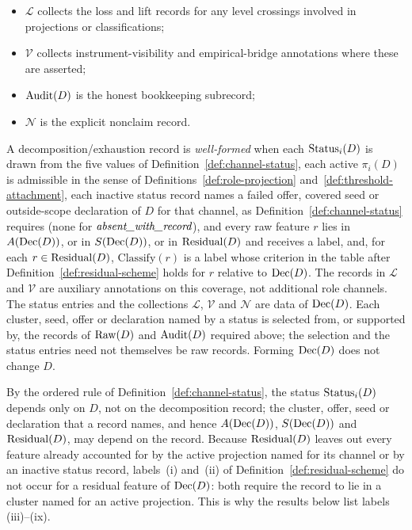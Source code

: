 \begin{definition}
\begin{itemize}[topsep=2pt,itemsep=1pt]
    relative to the chosen record, and \(\mathrm{Classify}\) assigns to each
    \(r \in \Residual{D}\), including any bookkeeping annotation not assigned
    to a channel, a label in the scheme of
    Definition~\ref{def:residual-scheme}; already covered bookkeeping may
    receive (ix);
  \item \(\mathcal{L}\) collects the loss and lift records for any level
    crossings involved in projections or classifications;
  \item \(\mathcal{V}\) collects instrument-visibility and
    empirical-bridge annotations where these are asserted;
  \item \(\operatorname{Audit}\!\left(D\right)\) is the honest bookkeeping subrecord;
  \item \(\mathcal{N}\) is the explicit nonclaim record.
\end{itemize}
A decomposition/exhaustion record is \emph{well-formed} when each
\(\operatorname{Status}_{i}\!\left(D\right)\) is drawn from the five values of
Definition~\ref{def:channel-status}, each active
\(\pi_i(D)\) is admissible in the sense of
Definitions~\ref{def:role-projection} and~\ref{def:threshold-attachment},
each inactive status record names a failed offer, covered seed or
outside-scope declaration of \(D\) for that channel, as
Definition~\ref{def:channel-status} requires (none for \(\textit{absent\_\allowbreak with\_\allowbreak record}\)), and every raw feature \(r\) lies in \(A(\operatorname{Dec}\!\left(D\right))\), or in \(S(\operatorname{Dec}\!\left(D\right))\), or in
\(\operatorname{Residual}\!\left(D\right)\) and receives a label, and, for each
\(r\in\Residual{D}\), \(\mathrm{Classify}(r)\) is a label whose criterion in the
table after Definition~\ref{def:residual-scheme} holds for \(r\) relative to
\(\operatorname{Dec}\!\left(D\right)\). The records in
\(\mathcal{L}\) and \(\mathcal{V}\) are auxiliary annotations on this
coverage, not additional role channels. The status entries and the
collections \(\mathcal{L}\), \(\mathcal{V}\) and \(\mathcal{N}\) are data
of \(\operatorname{Dec}\!\left(D\right)\). Each cluster, seed, offer or declaration named by a status is
selected from, or supported by, the records of \(\operatorname{Raw}\!\left(D\right)\) and \(\operatorname{Audit}\!\left(D\right)\)
required above; the selection and the status entries need not themselves be
raw records. Forming \(\operatorname{Dec}\!\left(D\right)\) does not change \(D\).
\end{definition}

By the ordered rule of Definition~\ref{def:channel-status}, the status
\(\operatorname{Status}_{i}\!\left(D\right)\) depends only on \(D\), not on the decomposition record; the
cluster, offer, seed or declaration that a record names, and hence
\(A(\operatorname{Dec}\!\left(D\right))\), \(S(\operatorname{Dec}\!\left(D\right))\) and \(\operatorname{Residual}\!\left(D\right)\), may depend on the record.
Because \(\operatorname{Residual}\!\left(D\right)\) leaves out every feature already accounted for by
the active projection named for its channel or by an inactive status record, labels~(i)
and~(ii) of Definition~\ref{def:residual-scheme} do not occur for a residual
feature of \(\operatorname{Dec}\!\left(D\right)\): both require the record to lie in a cluster named for
an active projection. This is why the results below list labels (iii)--(ix).

